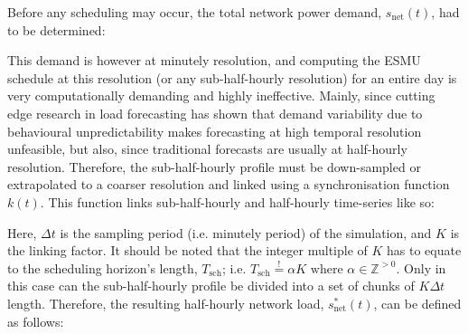 
Before any scheduling may occur, the total network power demand, $s_\text{net}(t)$, had to be determined:



This demand is however at minutely resolution, and computing the ESMU schedule at this resolution (or any sub-half-hourly resolution) for an entire day is very computationally demanding and highly ineffective.
Mainly, since cutting edge research in load forecasting has shown that demand variability due to behavioural unpredictability makes forecasting at high temporal resolution unfeasible, but also, since traditional forecasts are usually at half-hourly resolution.
Therefore, the sub-half-hourly profile must be down-sampled or extrapolated to a coarser resolution and linked using a synchronisation function $k(t)$.
This function links sub-half-hourly and half-hourly time-series like so:




Here, $\Delta t$ is the sampling period (i.e. minutely period) of the simulation, and $K$ is the linking factor.
It should be noted that the integer multiple of $K$ has to equate to the scheduling horizon's length, $T_\text{sch}$; i.e. $T_\text{sch} \overset{!}{=} \alpha K \text{ where } \alpha \in \mathbb{Z}^{>0}$.
Only in this case can the sub-half-hourly profile be divided into a set of chunks of $K\Delta t$ length.
Therefore, the resulting half-hourly network load, $s^{*}_\text{net}(t)$, can be defined as follows:

